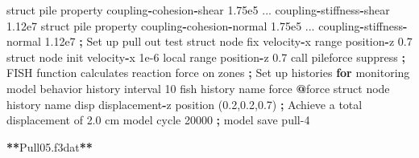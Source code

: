 \documentclass[a4paper, nobind]{templates/ociamthesis}
\newenvironment{Shaded}{\begin{snugshade}}{\end{snugshade}}
\newcommand{\BuiltInTok}[1]{#1}
\newcommand{\ControlFlowTok}[1]{\textcolor[rgb]{0.13,0.29,0.53}{\textbf{#1}}}
\newcommand{\DecValTok}[1]{\textcolor[rgb]{0.00,0.00,0.81}{#1}}
\newcommand{\FloatTok}[1]{\textcolor[rgb]{0.00,0.00,0.81}{#1}}
\newcommand{\NormalTok}[1]{#1}
\newcommand{\OperatorTok}[1]{\textcolor[rgb]{0.81,0.36,0.00}{\textbf{#1}}}
\newcommand{\StringTok}[1]{\textcolor[rgb]{0.31,0.60,0.02}{#1}}
\renewenvironment{Shaded}
{
  \vspace{10pt}%
  \begin{snugshade}%
}{%
  \end{snugshade}%
  \vspace{8pt}%
}
\begin{document}
\begin{Shaded}
\begin{Highlighting}[]
\NormalTok{    struct pile }\BuiltInTok{property}\NormalTok{ coupling}\OperatorTok{{-}}\NormalTok{cohesion}\OperatorTok{{-}}\NormalTok{shear }\FloatTok{1.75e5}\NormalTok{ ...}
\NormalTok{                         coupling}\OperatorTok{{-}}\NormalTok{stiffness}\OperatorTok{{-}}\NormalTok{shear }\FloatTok{1.12e7}
\NormalTok{    struct pile }\BuiltInTok{property}\NormalTok{ coupling}\OperatorTok{{-}}\NormalTok{cohesion}\OperatorTok{{-}}\NormalTok{normal }\FloatTok{1.75e5}\NormalTok{ ...}
\NormalTok{                         coupling}\OperatorTok{{-}}\NormalTok{stiffness}\OperatorTok{{-}}\NormalTok{normal }\FloatTok{1.12e7}
    \OperatorTok{;}\NormalTok{ Set up pull out test}
\NormalTok{    struct node fix  velocity}\OperatorTok{{-}}\NormalTok{x }\BuiltInTok{range}\NormalTok{ position}\OperatorTok{{-}}\NormalTok{z }\FloatTok{0.7}
\NormalTok{    struct node init velocity}\OperatorTok{{-}}\NormalTok{x }\FloatTok{1e{-}6}\NormalTok{ local }\BuiltInTok{range}\NormalTok{ position}\OperatorTok{{-}}\NormalTok{z }\FloatTok{0.7}
\NormalTok{    call }\StringTok{\textquotesingle{}pileforce\textquotesingle{}}\NormalTok{ suppress }\OperatorTok{;}\NormalTok{ FISH function calculates reaction force on zones}
    \OperatorTok{;}\NormalTok{ Set up histories }\ControlFlowTok{for}\NormalTok{ monitoring model behavior}
\NormalTok{    history interval }\DecValTok{10}
\NormalTok{    fish history name }\StringTok{\textquotesingle{}force\textquotesingle{}} \OperatorTok{@}\NormalTok{force}
\NormalTok{    struct node history name }\StringTok{\textquotesingle{}disp\textquotesingle{}}\NormalTok{ displacement}\OperatorTok{{-}}\NormalTok{z position (}\FloatTok{0.2}\NormalTok{,}\FloatTok{0.2}\NormalTok{,}\FloatTok{0.7}\NormalTok{)}
    \OperatorTok{;}\NormalTok{ Achieve a total displacement of }\FloatTok{2.0}\NormalTok{ cm}
\NormalTok{    model cycle }\DecValTok{20000}
    \OperatorTok{;}
\NormalTok{    model save }\StringTok{\textquotesingle{}pull{-}4\textquotesingle{}}

\OperatorTok{**}\NormalTok{Pull05.f3dat}\OperatorTok{**}


\end{Highlighting}
\end{Shaded}
\end{document}
